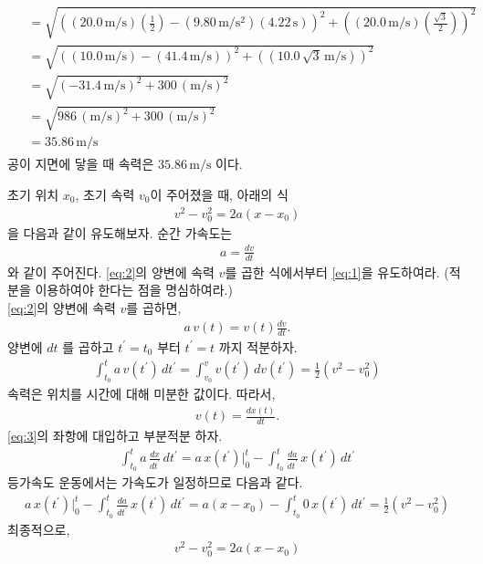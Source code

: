 \documentclass[floatfix,nofootinbib,superscriptaddress,fleqn,preprint]{revtex4}
\begin{document}
\begin{itemize}
\begin{align}
\begin{split}
      &=\sqrt{{\left((20.0\,\mathrm{m/s})\left(\frac{1}{2}\right)
      -(9.80\,\mathrm{m/s^2})(4.22\,\mathrm{s})\right)}^2
      +{\left((20.0\,\mathrm{m/s})\left(\frac{\sqrt{3}}{2}\right)\right)}^2}  \\
      &=\sqrt{{\left((10.0\,\mathrm{m/s})
      -(41.4\,\mathrm{m/s})\right)}^2
      +{\left((10.0\,\sqrt{3}\,\mathrm{m/s})\right)}^2} \\
      &=\sqrt{{\left(-31.4\,\mathrm{m/s}\right)}^2
      +300\,\mathrm{{(m/s)}^2}} \\
      &=\sqrt{986\,\mathrm{{(m/s)}^2}
      +300\,\mathrm{{(m/s)}^2}} \\
      &=35.86\,\mathrm{m/s}
    \end{split}
  \end{align}
  공이 지면에 닿을 때 속력은 $35.86\,\mathrm{m/s}$ 이다.
\end{itemize}

\vspace{2cm}

 초기 위치 $x_0$, 초기 속력 $v_0$이
주어졌을 때, 아래의 식
\begin{align}
  \label{eq:1}
v^2 - v_0^2 = 2a(x-x_0)  
\end{align}
을 다음과 같이 유도해보자. 순간 가속도는
\begin{align}
  \label{eq:2}
a = \frac{dv}{dt}
\end{align}
와 같이 주어진다. \eqref{eq:2}의 양변에 속력 $v$를 곱한 식에서부터
\eqref{eq:1}을 유도하여라. (적분을 이용하여야 한다는 점을 명심하여라.)  \\
 \eqref{eq:2}의 양변에 속력 $v$를 곱하면,
\begin{align}
  a\,v(t) = v(t)\frac{dv}{dt}.
\end{align}
양변에 $dt$ 를 곱하고 $t^{\prime}=t_0$ 부터 $t^\prime=t$ 까지 적분하자.
\begin{align}\label{eq:3}
  \int_{t_0}^t a\,v(t^\prime)\,dt^\prime = \int_{v_0}^v v(t^\prime)\,dv(t^\prime)
  =\frac{1}{2}\left(v^2-v^2_0\right)
\end{align} 
속력은 위치를 시간에 대해 미분한 값이다. 따라서,
\begin{align}
  v(t)=\frac{dx(t)}{dt}.
\end{align}
\eqref{eq:3}의 좌항에 대입하고 부분적분 하자.
\begin{align}
  \int_{t_0}^ta\,\frac{dx}{dt^\prime}\,dt^\prime
  =a\,x(t^\prime)|_{0}^t-\int_{t_0}^t\frac{da}{dt^\prime}\,x(t^\prime) \,dt^\prime
\end{align}
등가속도 운동에서는 가속도가 일정하므로 다음과 같다.
\begin{align}
  a\,x(t^\prime)|_{0}^t-\int_{t_0}^t\frac{da}{dt^\prime}\,x(t^\prime) \,dt^\prime
  =a\left(x-x_0\right)-\int_{t_0}^t0\,x(t^\prime) \,dt^\prime
  =\frac{1}{2}\left(v^2-v^2_0\right)
\end{align}
최종적으로,
\begin{align}
  v^2 - v_0^2 = 2a(x-x_0)  
\end{align}
\end{document}
